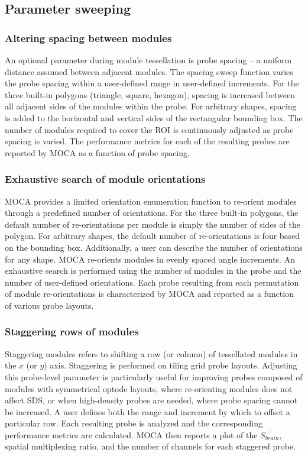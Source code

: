 \subsection{Parameter sweeping}
\subsubsection{Altering spacing between modules}
An optional parameter during module tessellation is probe spacing -- a uniform distance assumed between adjacent modules. The spacing sweep function varies the probe spacing within a user-defined range in user-defined increments. For the three built-in polygons (triangle, square, hexagon), spacing is increased between all adjacent sides of the modules within the probe. For arbitrary shapes, spacing is added to the horizontal and vertical sides of the rectangular bounding box. The number of modules required to cover the \ac{ROI} is continuously adjusted as probe spacing is varied. The performance metrics for each of the resulting probes are reported by \ac{MOCA} as a function of probe spacing.

\subsubsection{Exhaustive search of module orientations}
\ac{MOCA} provides a limited orientation enumeration function to re-orient modules through a predefined number of orientations. For the three built-in polygons, the default number of re-orientations per module is simply the number of sides of the polygon. For arbitrary shapes, the default number of re-orientations is four based on the bounding box. Additionally, a user can describe the number of orientations for any shape. \ac{MOCA} re-orients modules in evenly spaced angle increments. An exhaustive search is performed using the number of modules in the probe and the number of user-defined orientations. Each probe resulting from each permutation of module re-orientations is characterized by \ac{MOCA} and reported as a function of various probe layouts.

\subsubsection{Staggering rows of modules}
Staggering modules refers to shifting a row (or column) of tessellated modules in the $x$ (or $y$) axis. Staggering is performed on tiling grid probe layouts. Adjusting this probe-level parameter is particularly useful for improving probes composed of modules with symmetrical optode layouts, where re-orienting modules does not affect \ac{SDS}, or when high-density probes are needed, where probe spacing cannot be increased. A user defines both the range and increment by which to offset a particular row. Each resulting probe is analyzed and the corresponding performance metrics are calculated. \ac{MOCA} then reports a plot of the $\overline{S_{brain}}$, spatial multiplexing ratio, and the number of channels for each staggered probe.


